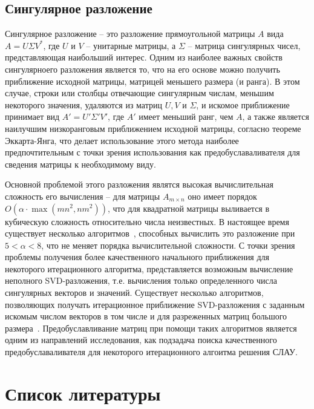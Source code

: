 \subsection{Сингулярное разложение}
Сингулярное разложение -- это разложение прямоугольной матрицы $A$ вида $A = U \Sigma V^*$, где $U$ и $V$ -- унитарные матрицы, а $\Sigma$ -- матрица сингулярных чисел, представляющая наибольший интерес. Одним из наиболее важных свойств сингулярноего разложения является то, что на его основе можно получить приближение исходной матрицы, матрицей меньшего размера (и ранга). В этом случае, строки или столбцы отвечающие сингулярным числам, меньшим некоторого значения, удаляются из матриц $U, V$ и $\Sigma$, и искомое приближение принимает вид $A' = U' \Sigma' V'$, где $A'$ имеет меньший ранг, чем $A$, а также является наилучшим низкоранговым приближением исходной матрицы, согласно теореме Эккарта-Янга, что делает использование этого метода наиболее предпочтительным с точки зрения использования как предобуславаливателя для сведения матрицы к необходимому виду.


Основной проблемой этого разложения являтся высокая вычислительная сложность его вычисления -- для матрицы $A_{m \times n}$ оно имеет порядок $O\left(\alpha \cdot \max(mn^2, nm^2) \right)$, что для квадратной матрицы выливается в кубическую сложность относительно числа неизвестных. В настоящее время существует несколько алгоритмов~\cite{fastSVD, fitSVD}, способных вычислить это разложение при $5 < \alpha < 8$, что не меняет порядка вычислительной сложности. С точки зрения проблемы получения более качественного начального приближения для некоторого итерационного алгоритма, представляется возможным вычисление неполного SVD-разложения, т.е. вычисления только определенного числа сингулярных векторов и значений. Существует несколько алгоритмов, позволяющих получать итерационное приближение SVD-разложения с заданным искомым числом векторов в том числе и для разреженных матриц большого размера~\cite{krylovShurIterSVD, blockKrylovIterSVD, twoIterSVD, quicIterSVD, noisyIterSVD}. Предобуславливание матриц при помощи таких алгоритмов является одним из направлений исследования, как подзадача поиска качественного предобуславаливателя для некоторого итерационного алгоитма решения СЛАУ.


\nocite{*}
\section*{Список литературы}
\printbibliography[heading=none]
